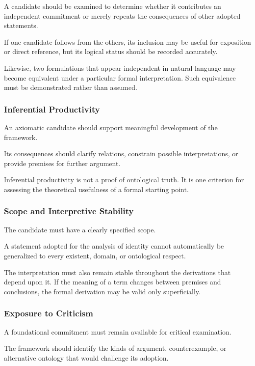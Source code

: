 A candidate should be examined to determine
whether it contributes an independent
commitment or merely repeats the consequences
of other adopted statements.

If one candidate follows from the others,
its inclusion may be useful for exposition
or direct reference, but its logical status
should be recorded accurately.

Likewise, two formulations that appear
independent in natural language may become
equivalent under a particular formal
interpretation. Such equivalence must
be demonstrated rather than assumed.

\subsubsection{Inferential Productivity}

An axiomatic candidate should support
meaningful development of the framework.

Its consequences should clarify relations,
constrain possible interpretations, or
provide premises for further argument.

Inferential productivity is not a proof
of ontological truth. It is one criterion
for assessing the theoretical usefulness
of a formal starting point.

\subsubsection{Scope and Interpretive Stability}

The candidate must have a clearly specified
scope.

A statement adopted for the analysis of
identity cannot automatically be generalized
to every existent, domain, or ontological
respect.

The interpretation must also remain stable
throughout the derivations that depend
upon it. If the meaning of a term changes
between premises and conclusions, the
formal derivation may be valid only
superficially.

\subsubsection{Exposure to Criticism}

A foundational commitment must remain
available for critical examination.

The framework should identify the kinds
of argument, counterexample, or alternative
ontology that would challenge its adoption.

